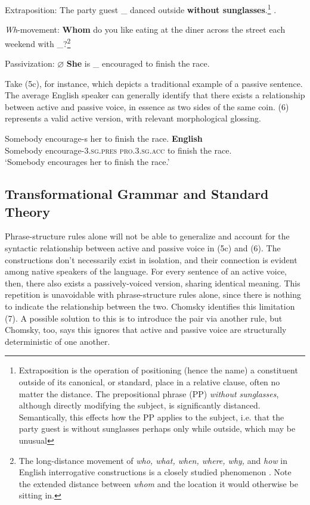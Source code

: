 \documentclass{article}
\begin{document}
\ea \label{Transformations}
    \begin{xlist}
    \ex Extraposition: The party guest \_ danced outside \textbf{without sunglasses}.\footnote{Extraposition is the operation of positioning (hence the name) a constituent outside of its canonical, or standard, place in a relative clause, often no matter the distance. The prepositional phrase (PP) \textit{without sunglasses}, although directly modifying the subject, is significantly distanced. Semantically, this effects how the PP applies to the subject, i.e. that the party guest is without sunglasses perhaps only while outside, which may be unusual} .
    
    \ex \textit{Wh}-movement: \textbf{Whom} do you like eating at the diner across the street each weekend with \_?\footnote{The long-distance movement of \textit{who, what, when, where, why,} and \textit{how} in English interrogative constructions is a closely studied phenomenon \citep{Chomsky77, Kiss93}. Note the extended distance between \textit{whom} and the location it would otherwise be sitting in.}

    \ex Passivization: $\varnothing$ \textbf{She} is \_  encouraged to finish the race.\
    \end{xlist}
\z

Take (5c), for instance, which depicts a traditional example of a passive sentence. The average English speaker can generally identify that there exists a relationship between active and passive voice, in essence as two sides of the same coin. (6) represents a valid active version, with relevant morphological glossing.

\ea \label{ActiveTrans}
\gll Somebody encourage-s her to finish the race. \hspace{1 in}  \textbf{English} \\
Somebody encourage-{\scshape 3.sg.pres} {\scshape pro.3.sg.acc} to finish the race. \\
\glt `Somebody encourages her to finish the race.'
\z

\subsection{Transformational Grammar and Standard Theory}

Phrase-structure rules alone will not be able to generalize and account for the syntactic relationship between active and passive voice in (5c) and (6). The constructions don't necessarily exist in isolation, and their connection is evident among native speakers of the language. For every sentence of an active voice, then, there also exists a passively-voiced version, sharing identical meaning. This repetition is unavoidable with phrase-structure rules alone, since there is nothing to indicate the relationship between the two. Chomsky identifies this limitation (7). A possible solution to this is to introduce the pair via another rule, but Chomsky, too, says this ignores that active and passive voice are structurally deterministic of one another. 
\end{document}
